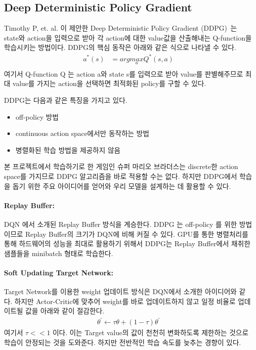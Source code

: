 \subsection{Deep Deterministic Policy Gradient}
Timothy P, et. al. 이 제안한 Deep Deterministic Policy Gradient (DDPG)~\cite{DDPG}는 state와 action을 입력으로 받아 각 action에 대한 value값을 산출해내는 Q-function을 학습시키는 방법이다.
DDPG의 핵심 동작은 아래와 같은 식으로 나타낼 수 있다.
\begin{align*}
	a^*(s) &= arg \underset{a}{max} Q^*(s,a) \\
\end{align*}
여기서 Q-function Q 는 action a와 state s를 입력으로 받아 value를 판별해주므로 최대 value를 가지는 action을 선택하면 최적화된 policy를 구할 수 있다.

DDPG는 다음과 같은 특징을 가지고 있다.
\begin{itemize}
	\item off-policy 방법
	\item continuous action space에서만 동작하는 방법
	\item 병렬화된 학습 방법을 제공하지 않음
\end{itemize}
본 프로젝트에서 학습하기로 한 게임인 슈퍼 마리오 브라더스는 discrete한 action space를 가지므로 DDPG 알고리즘을 바로 적용할 수는 없다.
하지만 DDPG에서 학습을 돕기 위한 주요 아이디어를 얻어와 우리 모델을 설계하는 데 활용할 수 있다.

\paragraph{\textbf{Replay Buffer:}}
DQN 에서 소개된 Replay Buffer 방식을 계승한다.
DDPG 는 off-policy 를 위한 방법이므로 Replay Buffer의 크기가 DQN에 비해 커질 수 있다.
GPU를 통한 병렬처리를 통해 하드웨어의 성능을 최대로 활용하기 위해서 DDPG는 Replay Buffer에서 채취한 샘플들을 minibatch 형태로 학습한다.
\paragraph{\textbf{Soft Updating Target Network:}}
Target Network를 이용한 weight 업데이트 방식은 DQN에서 소개한 아이디어와 같다.
하지만 Actor-Critic에 맞추어 weight를 바로 업데이트하지 않고 일정 비율로 업데이트될 값을 아래와 같이 절감한다.
\begin{align*}
	\theta^{'} \leftarrow \tau\theta + (1 - \tau)\theta^{'}
\end{align*}
여기서 $\tau << 1$ 이다.
이는 Target value의 값이 천천히 변화하도록 제한하는 것으로 학습이 안정되는 것을 도와준다.
하지만 전반적인 학습 속도를 늦추는 경향이 있다.

